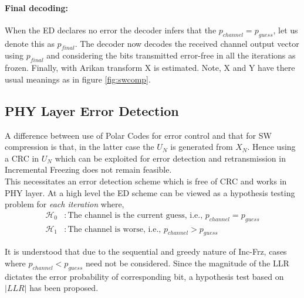 \documentclass[
11pt, %
a4paper, %
oneside, %
headinclude,footinclude, %
BCOR5mm, %
]{scrartcl}
\begin{document}
\paragraph{Final decoding:}When the ED declares no error the decoder infers that the $p_{channel}=p_{guess}$, let us denote this as $p_{final}$. The decoder now  decodes the received channel output vector using $p_{final}$ and considering the bits transmitted error-free in all the iterations as frozen. Finally, with Arikan transform X is estimated.
Note, X and Y have there usual meanings as in figure \ref{fig:swcomp}. 


\subsection{PHY Layer Error Detection} 

A difference between use of Polar Codes for error control and that for SW compression is that, in the latter case the $U_N$ is generated from $X_N$. Hence using a CRC in $U_N$ which can be exploited for error detection and retransmission in Incremental Freezing does not remain feasible.\\This necessitates an error detection scheme which is free of CRC and works in PHY layer. At a high level the ED scheme can be viewed as a hypothesis testing problem for \emph{each iteration} where,
\begin{align*}
\mathcal{H}_0 & :\text{The channel is the current guess, i.e., } p_{channel}=p_{guess}\\
\mathcal{H}_1 & :\text{The channel is worse, i.e., } p_{channel} > p_{guess}
\end{align*}

It is understood that due to the sequential and greedy nature of Inc-Frz, cases where $p_{channel} < p_{guess}$ need not be considered. Since the magnitude of the LLR dictates the error probability of corresponding bit, a hypothesis test based on $|LLR|$ has been proposed.
\end{document}
